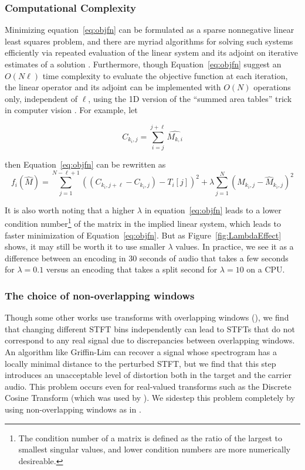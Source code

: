 \documentclass[runningheads]{llncs}
\begin{document}
\subsubsection{Computational Complexity}
\label{sec:computation}
Minimizing equation~\ref{eq:objfn} can be formulated as a sparse nonnegative linear least squares problem, and there are myriad algorithms \cite{branch1999subspace} for solving such systems efficiently via repeated evaluation of the linear system and its adjoint on iterative estimates of a solution .  Furthermore, though Equation~\ref{eq:objfn} suggest an $O(N \ell)$ time complexity to evaluate the objective function at each iteration, the linear operator and its adjoint can be implemented with $O(N)$ operations only, independent of $\ell$, using the 1D version of the ``summed area tables'' trick in computer vision \cite{lewisfast}.  For example, let 

\begin{equation}
  \label{eq:cumusum}
  C_{k_i, j} = \sum_{i=j}^{j+\ell} \hat{M_{k, i}}
\end{equation}

then Equation~\ref{eq:objfn} can be rewritten as 
\begin{equation}
  \label{eq:objfncumusum}
  f_i(\hat{M}) = \sum_{j=1}^{N-\ell+1} \left( (C_{k_i, j+\ell}-C_{k_i, j}) - T_i[j] \right)^2 + \lambda \sum_{j=1}^N \left( M_{k_i, j} - \hat{M}_{k_i, j} \right)^2
\end{equation}


It is also worth noting that a higher $\lambda$ in equation~\ref{eq:objfn} leads to a lower condition number\footnote{The condition number of a matrix is defined as the ratio of the largest to smallest singular values, and lower condition numbers are more numerically desireable.} of the matrix in the implied linear system, which leads to faster minimization of Equation~\ref{eq:objfn}.  But as Figure~\ref{fig:LambdaEffect} shows, it may still be worth it to use smaller $\lambda$ values.  In practice, we see it as a difference between an encoding in 30 seconds of audio that takes a few seconds for $\lambda=0.1$ versus an encoding that takes a split second for $\lambda=10$ on a CPU.



\subsubsection{The choice of non-overlapping windows}
Though some other works use transforms with overlapping windows (\cite{hwan_sik_yun_acoustic_2010,geleta_pixinwav_2021}), we find that changing different STFT bins independently can lead to STFTs that do not correspond to any real signal due to discrepancies between overlapping windows.  An algorithm like Griffin-Lim \cite{griffin1984signal} can recover a signal whose spectrogram has a locally minimal distance to the perturbed STFT, but we find that this step introduces an unacceptable level of distortion both in the target and the carrier audio.  This problem occurs even for real-valued transforms such as the Discrete Cosine Transform (which was used by \cite{geleta_pixinwav_2021}).  We sidestep this problem completely by using non-overlapping windows as in \cite{xiaoxiao_dong_data_2004}.  
\end{document}
